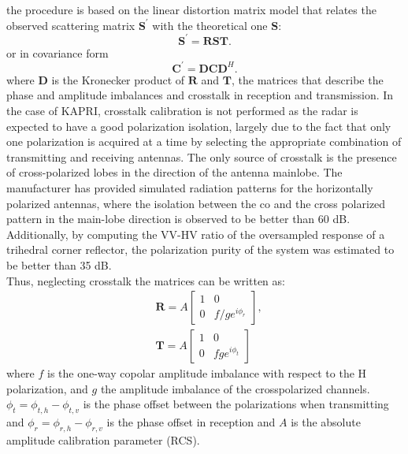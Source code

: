 the procedure is based on the linear distortion matrix model\cite{Saraband1990, Sarabandi1992a} that relates the observed scattering matrix $\mathbf{S^\prime}$ with the theoretical one $\mathbf{S}$:
\begin{equation}\label{eq:distorsion_scattering}
	\mathbf{S^\prime} = \mathbf{R} \mathbf{S} \mathbf{T}.
\end{equation}
or in covariance form
\begin{equation}\label{eq:covariance_distortion}
	\mathbf{C}^\prime = \mathbf{D} \mathbf{C} \mathbf{D}^{H}.
\end{equation}
where $\mathbf{D}$ is the Kronecker product of $\mathbf{R}$ and $\mathbf{T}$, the matrices that describe the phase and amplitude imbalances and crosstalk in reception and transmission.
In the case of KAPRI, crosstalk calibration is not performed as the radar is expected to have a good polarization isolation, largely due to the fact that only one polarization is acquired at a time by selecting the appropriate combination of transmitting and receiving antennas. The only source of crosstalk is the presence of cross-polarized lobes in the direction of the antenna mainlobe. The manufacturer has provided simulated radiation patterns for the horizontally polarized antennas, where the isolation between the co and the cross polarized pattern in the main-lobe direction is observed to be better than 60 dB. Additionally, by computing the VV-HV ratio of the oversampled response of a trihedral corner reflector, the polarization purity of the system was estimated to be better than 35 dB.\\
Thus, neglecting crosstalk the matrices can be written as:
\begin{equation}
	\begin{aligned}
	&\mathbf{R} = A \begin{bmatrix}
		1 & 0\\
		0 & f/g e^{i\phi_{r}}
	\end{bmatrix},\\
	&\mathbf{T} = A \begin{bmatrix}
			1 & 0\\
			0 & f g e^{i\phi_{t}}
		\end{bmatrix}
	\end{aligned}
\end{equation}
where $f$ is the one-way copolar amplitude imbalance with respect to the H polarization, and $g$ the amplitude imbalance of the crosspolarized channels. $\phi_t = \phi_{t,h} -\phi_{t,v}$ is the phase offset between the polarizations when transmitting and $\phi_{r} = \phi_{r,h} -\phi_{r,v}$ is the phase offset in reception and $A$ is the absolute amplitude calibration parameter (RCS)\cite{Ainsworth2006a, Fore2015}.\\
